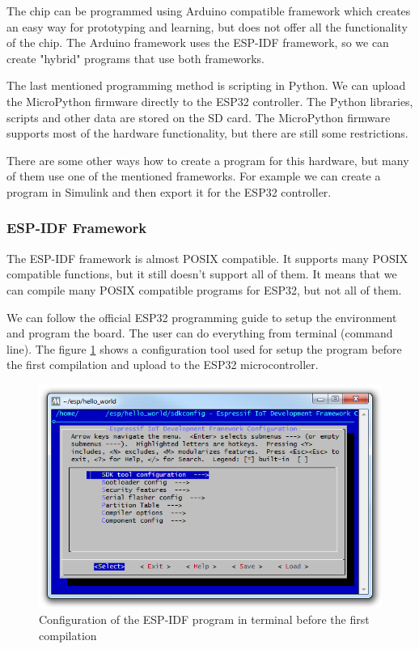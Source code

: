 The chip can be programmed using Arduino compatible framework \cite{espressif:ArduinoCore} which creates an easy way for prototyping and learning, but does not offer all the functionality of the chip. The Arduino framework uses the ESP-IDF framework, so we can create "hybrid" programs that use both frameworks.

The last mentioned programming method is scripting in Python. We can upload the MicroPython \cite{MicroPython} firmware directly to the ESP32 controller. The Python libraries, scripts and other data are stored on the SD card. The MicroPython firmware supports most of the hardware functionality, but there are still some restrictions.

There are some other ways how to create a program for this hardware, but many of them use one of the mentioned frameworks. For example we can create a program in Simulink and then export it for the ESP32 controller. \cite{ArduinoSimulink}

\subsubsection{ESP-IDF Framework}
The ESP-IDF framework is almost POSIX compatible. \cite{ESP32posix} It supports many POSIX compatible functions, but it still doesn't support all of them. It means that we can compile many POSIX compatible programs for ESP32, but not all of them.

We can follow the official ESP32 programming guide \cite{ESP32programmingGuide} to setup the environment and program the board. The user can do everything from terminal (command line). The figure \ref{ESP32menuconfig} shows a configuration tool used for setup the program before the first compilation and upload to the ESP32 microcontroller.

\begin{figure}
	\centering
	\label{ESP32menuconfig}
	\caption{Configuration of the ESP-IDF program in terminal before the first compilation}
	\includegraphics[width=16cm]{img/ESP32menuconfig.png}
\end{figure}

